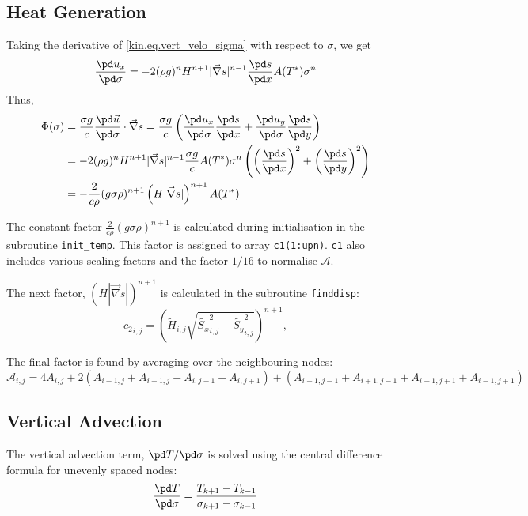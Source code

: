 \subsection{Heat Generation}
Taking the derivative of \eqref{kin.eq.vert_velo_sigma} with respect to $\sigma$, we get
\begin{equation}
  \frac{\pd u_x}{\pd\sigma} = -2(\rho g)^nH^{n+1}|\vec\nabla s|^{n-1}\frac{\pd s}{\pd x}A(T^\ast)\sigma^n
\end{equation}
Thus,
\begin{equation}
\begin{split}
  \Phi(\sigma) &= \frac{\sigma g}c\frac{\pd \vec{u}}{\pd\sigma}\cdot\vec\nabla s  = \frac{\sigma g}c\left(\frac{\pd u_x}{\pd \sigma}\frac{\pd s}{\pd x} + \frac{\pd u_y}{\pd \sigma}\frac{\pd s}{\pd y}\right)\\
       &= -2(\rho g)^nH^{n+1}|\vec\nabla s|^{n-1}\frac{\sigma g}cA(T^\ast)\sigma^n \left(\left(\frac{\pd s}{\pd x}\right)^2+\left(\frac{\pd s}{\pd y}\right)^2\right) \\
       &= -\frac2{c\rho}(g\sigma\rho)^{n+1}\left(H|\vec\nabla s|\right)^{n+1}A(T^\ast)
\end{split}  
\end{equation}

The constant factor $\frac2{c\rho}(g\sigma\rho)^{n+1}$ is calculated during initialisation in the subroutine \texttt{init\_temp}. This factor is assigned to array \texttt{c1(1:upn)}. \texttt{c1} also includes various scaling factors and the factor $1/16$ to normalise $\mathcal{A}$.

The next factor, $\left(H|\vec\nabla s|\right)^{n+1}$ is calculated in the subroutine \texttt{finddisp}:
\begin{equation}
  {c_2}_{i,j} = \left(\tilde{H}_{i,j}\sqrt{\tilde{S_x}_{i,j}^2+\tilde{S_y}_{i,j}^2}\right)^{n+1},
\end{equation}


The final factor is found by averaging over the neighbouring nodes:
\begin{equation}
  \mathcal{A}_{i,j}=4A_{i,j}+2(A_{i-1,j}+A_{i+1,j}+A_{i,j-1}+A_{i,j+1})+(A_{i-1,j-1}+A_{i+1,j-1}+A_{i+1,j+1}+A_{i-1,j+1})
\end{equation}

\subsection{Vertical Advection}\label{temp.sec.vert_ad}
The vertical advection term, $\pd T/\pd\sigma$ is solved using the central difference formula for unevenly spaced nodes:
\begin{equation}
  \frac{\pd T}{\pd\sigma}=\frac{T_{k+1}-T_{k-1}}{\sigma_{k+1}-\sigma_{k-1}}
\end{equation}

